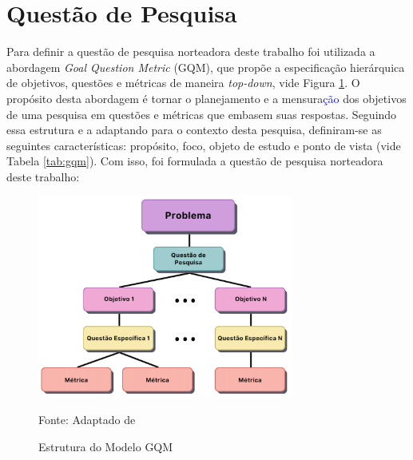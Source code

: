 \section{Questão de Pesquisa} 
\label{sec:questao}

Para definir a questão de pesquisa norteadora deste trabalho foi utilizada a abordagem \textit{Goal Question Metric} (GQM), que propõe a especificação hierárquica de objetivos, questões e métricas de maneira \textit{top-down}, vide Figura \ref{fig:GOAL_QUESTION_METRIC}. O propósito desta abordagem é tornar o planejamento e a mensura\textcolor{blue}{ção} dos objetivos de uma pesquisa em questões e métricas que embasem suas respostas. Seguindo essa estrutura e a adaptando para o contexto desta pesquisa, definiram-se as seguintes características: propósito, foco, objeto de estudo e ponto de vista (vide Tabela \ref{tab:gqm}). Com isso, foi formulada a questão de pesquisa norteadora deste trabalho:

\begin{figure}[h] 
    \centering
    \caption{Estrutura do Modelo GQM}
    \includegraphics[width=0.75\textwidth]{figuras/gqm.png}

    \begin{center}
    \text Fonte: Adaptado de  
    
    \end{center}
    \label{fig:GOAL_QUESTION_METRIC}
\end{figure}


